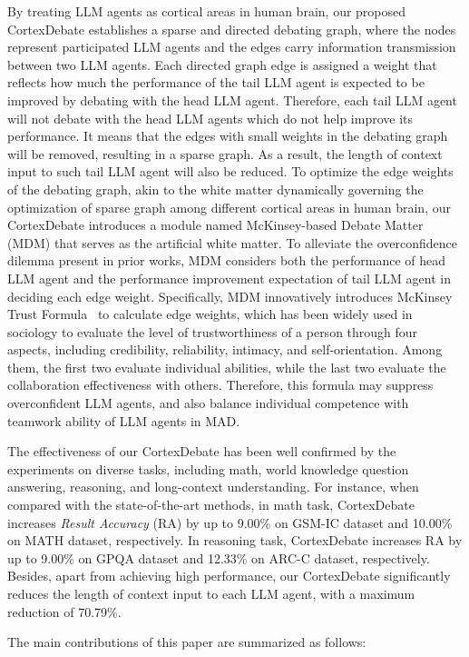By treating LLM agents as cortical areas in human brain, our proposed CortexDebate establishes a sparse and directed debating graph, where the nodes represent participated LLM agents and the edges carry information transmission between two LLM agents. Each directed graph edge is assigned a weight that reflects how much the performance of the tail LLM agent is expected to be improved by debating with the head LLM agent. Therefore, each tail LLM agent will not debate with the head LLM agents which do not help improve its performance. It means that the edges with small weights in the debating graph will be removed, resulting in a sparse graph. As a result, the length of context input to such tail LLM agent will also be reduced. To optimize the edge weights of the debating graph, akin to the white matter dynamically governing the optimization of sparse graph among different cortical areas in human brain, our CortexDebate introduces a module named McKinsey-based Debate Matter (MDM) that serves as the artificial white matter. To alleviate the overconfidence dilemma present in prior works, MDM considers both the performance of head LLM agent and the performance improvement expectation of tail LLM agent in deciding each edge weight. Specifically, MDM innovatively introduces McKinsey Trust Formula~\citep{lamarre2012mckinsey} to calculate edge weights, which has been widely used in sociology to evaluate the level of trustworthiness of a person through four aspects, including credibility, reliability, intimacy, and self-orientation. Among them, the first two evaluate individual abilities, while the last two evaluate the collaboration effectiveness with others. Therefore, this formula may suppress overconfident LLM agents, and also balance individual competence with teamwork ability of LLM agents in MAD.

The effectiveness of our CortexDebate has been well confirmed by the experiments on diverse tasks, including math, world knowledge question answering, reasoning, and long-context understanding. For instance, when compared with the state-of-the-art methods, in math task, CortexDebate increases \textit{Result Accuracy} (RA) by up to 9.00\% on GSM-IC dataset and 10.00\% on MATH dataset, respectively. In reasoning task, CortexDebate increases RA by up to 9.00\% on GPQA dataset and 12.33\% on ARC-C dataset, respectively. Besides, apart from achieving high performance, our CortexDebate significantly reduces the length of context input to each LLM agent, with a maximum reduction of 70.79\%.

The main contributions of this paper are summarized as follows:

